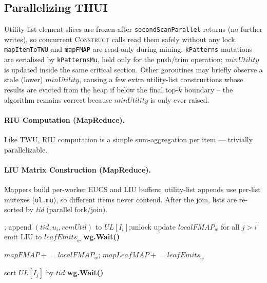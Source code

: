 \subsection{Parallelizing THUI}

Utility-list element slices are frozen after \texttt{secondScanParallel}
returns (no further writes), so concurrent \textsc{Construct} calls read
them safely without any lock.
\texttt{mapItemToTWU} and \texttt{mapFMAP} are read-only during mining.
\texttt{kPatterns} mutations are serialised by \texttt{kPatternsMu}, held
only for the push/trim operation; $\mathit{minUtility}$ is updated inside
the same critical section.
Other goroutines may briefly observe a stale (lower) $\mathit{minUtility}$,
causing a few extra utility-list constructions whose results are evicted from
the heap if below the final top-$k$ boundary -- the algorithm remains correct
because $\mathit{minUtility}$ is only ever raised.

\paragraph{RIU Computation (MapReduce).}
Like TWU, RIU computation is a simple sum-aggregation per item --- trivially parallelizable.

\paragraph{LIU Matrix Construction (MapReduce).}
Mappers build per-worker EUCS and LIU buffers; utility-list appends use
per-list mutexes (\texttt{ul.mu}), so different items never contend.
After the join, lists are re-sorted by \textit{tid} (parallel fork/join).

\begin{algorithm}[H]
\caption{Utility-List and LIU Construction (\texttt{secondScanParallel})}
\label{alg:pthui-scan2}
\begin{algorithmic}[1]

      \State {};\quad
             append $(\mathit{tid}, u_i, \mathit{remUtil})$ to $UL[I_i]$;\quad unlock
      \State update $\mathit{localFMAP}_w$ for all $j > i$ \hfill{}
      \State emit LIU to $\mathit{leafEmits}_w$ \hfill{}
    \EndFor
  \EndFor
\EndFor
\State {} \textbf{wg.Wait()}

  \State $\mathit{mapFMAP} \mathrel{+}= \mathit{localFMAP}_w$;\quad
         $\mathit{mapLeafMAP} \mathrel{+}= \mathit{leafEmits}_w$
\EndFor

  \State sort $UL[I_j]$ by $\mathit{tid}$
\EndFor
\State {} \textbf{wg.Wait()}
\end{algorithmic}
\end{algorithm}


